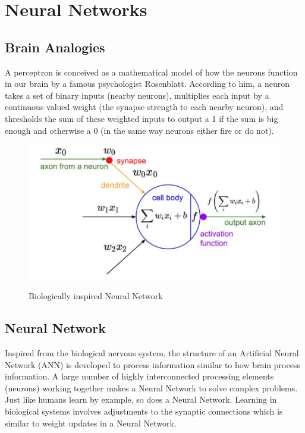 \pagebreak

\section{Neural Networks}
\subsection{Brain Analogies}

A perceptron is conceived as a mathematical model of how the neurons function in our brain by a famous psychologist Rosenblatt. According to him, a neuron  takes a set of binary inputs (nearby neurons), multiplies each input by a continuous valued weight (the synapse strength to each nearby neuron), and thresholds the sum of these weighted inputs to output a 1 if the sum is big enough and otherwise a 0 (in the same way neurons either fire or do not).

\begin{figure}[H]
\begin{center}
\includegraphics[height=.28\textheight]{Chapter2/Figs/NeuralNetwork.png}
\label{fig:Neural_Network}
\caption{Biologically inspired Neural Network \cite{karparthy}}
\end{center}
\end{figure}

\subsection{Neural Network}

Inspired from the biological nervous system, the structure of an Artificial Neural Network (ANN) is developed to process information similar to how brain process information. A large number of highly interconnected processing elements (neurons) working together makes a Neural Network to solve complex problems. Just like humans learn by example, so does a Neural Network. Learning in biological systems involves adjustments to the synaptic connections which is similar to weight updates in a Neural Network. 


